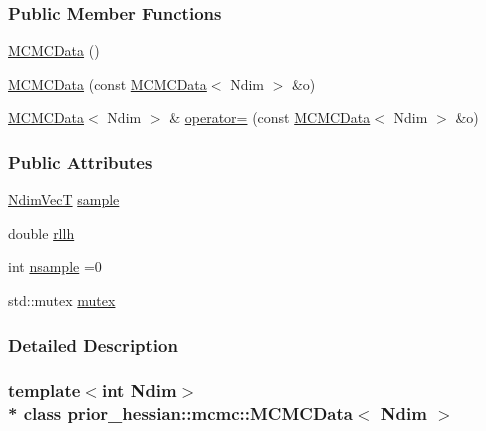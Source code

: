 \subsubsection*{Public Member Functions}
\begin{DoxyCompactItemize}
\item 
\hyperlink{classprior__hessian_1_1mcmc_1_1MCMCData_abacd5710cd385ab3c9737be39b3dcbf4}{M\+C\+M\+C\+Data} ()
\item 
\hyperlink{classprior__hessian_1_1mcmc_1_1MCMCData_ae2873b620b752ef00d4a8a38f7fd9b2b}{M\+C\+M\+C\+Data} (const \hyperlink{classprior__hessian_1_1mcmc_1_1MCMCData}{M\+C\+M\+C\+Data}$<$ Ndim $>$ \&o)
\item 
\hyperlink{classprior__hessian_1_1mcmc_1_1MCMCData}{M\+C\+M\+C\+Data}$<$ Ndim $>$ \& \hyperlink{classprior__hessian_1_1mcmc_1_1MCMCData_a1d3228c1cd3d56cf4b6087e2e27b50ad}{operator=} (const \hyperlink{classprior__hessian_1_1mcmc_1_1MCMCData}{M\+C\+M\+C\+Data}$<$ Ndim $>$ \&o)
\end{DoxyCompactItemize}
\subsubsection*{Public Attributes}
\begin{DoxyCompactItemize}
\item 
\hyperlink{classprior__hessian_1_1mcmc_1_1MCMCData_a2d9e789ebad080d8af3b0a221c529099}{Ndim\+VecT} \hyperlink{classprior__hessian_1_1mcmc_1_1MCMCData_a97efdedc5edd49ece7550418f122ad4d}{sample}
\item 
double \hyperlink{classprior__hessian_1_1mcmc_1_1MCMCData_a5d6330749b57307761c9b7124b94f337}{rllh}
\item 
int \hyperlink{classprior__hessian_1_1mcmc_1_1MCMCData_ad6cd36c82044f291c2d6f061acc960dd}{nsample} =0
\item 
std\+::mutex \hyperlink{classprior__hessian_1_1mcmc_1_1MCMCData_a3a3367abe6e642f25b12abb66f3b2dc6}{mutex}
\end{DoxyCompactItemize}


\subsubsection{Detailed Description}
\subsubsection*{template$<$int Ndim$>$\\*
class prior\+\_\+hessian\+::mcmc\+::\+M\+C\+M\+C\+Data$<$ Ndim $>$}



